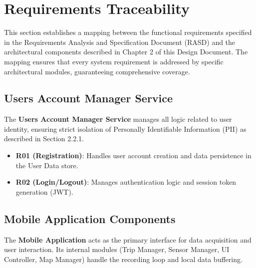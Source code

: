 \chapter{Requirements Traceability}
\label{ch:requirements-traceability}

This section establishes a mapping between the functional requirements specified in the Requirements Analysis and Specification Document (RASD) and the architectural components described in Chapter 2 of this Design Document. The mapping ensures that every system requirement is addressed by specific architectural modules, guaranteeing comprehensive coverage.

\section*{Users Account Manager Service}

The \textbf{Users Account Manager Service} manages all logic related to user identity, ensuring strict isolation of Personally Identifiable Information (PII) as described in Section 2.2.1.

\begin{itemize}
    \item \textbf{R01 (Registration)}: Handles user account creation and data persistence in the User Data store.
    \item \textbf{R02 (Login/Logout)}: Manages authentication logic and session token generation (JWT).
\end{itemize}

\section*{Mobile Application Components}

The \textbf{Mobile Application} acts as the primary interface for data acquisition and user interaction. Its internal modules (Trip Manager, Sensor Manager, UI Controller, Map Manager) handle the recording loop and local data buffering.

